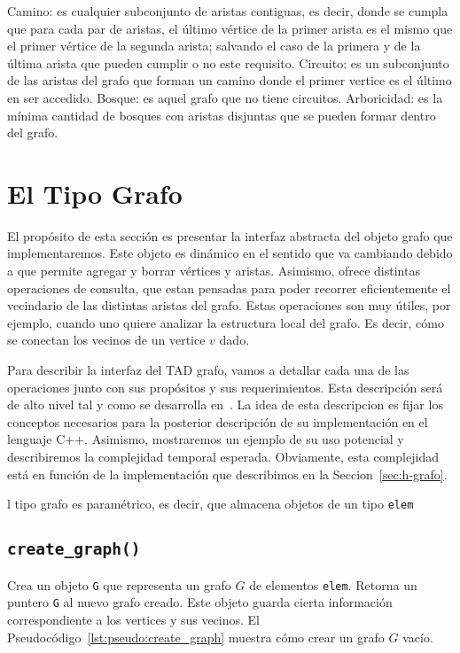 \documentclass[a4paper,12pt]{article}
\makeatletter
\newcommand{\Code}[1]{\lstinline[basicstyle={\tt}]@#1@}
\makeatother
\begin{document}
Camino: es cualquier subconjunto de aristas contiguas, es decir, donde se cumpla que para cada par de aristas, el último vértice de la primer arista es el mismo que el primer vértice de la segunda arista; salvando el caso de la primera y de la última arista que pueden cumplir o no este requisito.  Circuito: es un subconjunto de las aristas del grafo que forman un camino donde el primer vertice es el último en ser accedido.  Bosque: es aquel grafo que no tiene circuitos.  Arboricidad: es la mínima cantidad de bosques con aristas disjuntas que se pueden formar dentro del grafo.

\section{El Tipo Grafo}
\label{sec:tad grafo}

\def\lstlistingname{Pseudocódigo}
 
El propósito de esta sección es presentar la interfaz abstracta del objeto grafo que implementaremos.  Este objeto es dinámico en el sentido que va cambiando debido a que permite agregar y borrar vértices y aristas.  Asimismo, ofrece distintas operaciones de consulta, que estan pensadas para poder recorrer eficientemente el vecindario de las distintas aristas del grafo.  Estas operaciones son muy útiles, por ejemplo, cuando uno quiere analizar la estructura local del grafo.  Es decir, cómo se conectan los vecinos de un vertice $v$ dado.  

Para describir la interfaz del TAD grafo, vamos a detallar cada una de las operaciones junto con sus propósitos y sus requerimientos.  Esta descripción será de alto nivel tal y como se desarrolla en~\cite{}.  La idea de esta descripcion es fijar los conceptos necesarios para la posterior descripción de su implementación en el lenguaje C++.  Asimismo, mostraremos un ejemplo de su uso potencial y describiremos la complejidad temporal esperada.  Obviamente, esta complejidad está en función de la implementación que describimos en la Seccion~\ref{sec:h-grafo}.  

l tipo grafo es paramétrico, es decir, que almacena objetos de un tipo \texttt{elem}

\subsection{\texttt{create\_graph()}}
\label{sec:tad grafo:create-graph}

Crea un objeto \Code{G} que representa un grafo $G$ de elementos \Code{elem}. Retorna un puntero \Code{G} al nuevo grafo creado. Este objeto guarda cierta información correspondiente a los vertices y sus vecinos. El \lstlistingname~\ref{lst:pseudo:create_graph} muestra cómo crear un grafo $G$ vacío.
\end{document}
